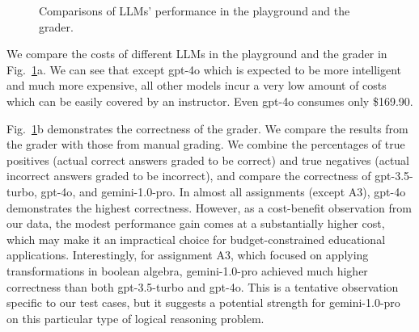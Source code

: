 \documentclass{article} %
\begin{document}
\begin{figure}
\centering
{}
  \caption{Comparisons of LLMs' performance in the playground and the grader.}
  \label{fig:LLM}
  \end{figure}
We compare the costs of different LLMs in the playground and the grader in Fig.~\ref{fig:LLM}a. We can see that except \textsf{gpt-4o} which is expected to be more intelligent and much more expensive, all other models incur a very low amount of costs which can be easily covered by an instructor. Even \textsf{gpt-4o} consumes only \$169.90.


Fig.~\ref{fig:LLM}b demonstrates the correctness of the grader. We compare the results from the grader with those from manual grading. We combine the percentages of true positives (actual correct answers graded to be correct) and true negatives (actual 
incorrect answers graded to be incorrect), and compare the correctness of \textsf{gpt-3.5-turbo}, \textsf{gpt-4o}, and \textsf{gemini-1.0-pro}. In almost all assignments (except A3), \textsf{gpt-4o} demonstrates the highest correctness. However, as a cost-benefit observation from our data, the modest performance gain comes at a substantially higher cost, which may make it an impractical choice for budget-constrained educational applications. Interestingly, for assignment A3, which focused on applying transformations in boolean algebra, \textsf{gemini-1.0-pro} achieved much higher correctness than both \textsf{gpt-3.5-turbo} and \textsf{gpt-4o}. This is a tentative observation specific to our test cases, but it suggests a potential strength for \textsf{gemini-1.0-pro} on this particular type of logical reasoning problem.
\end{document}

